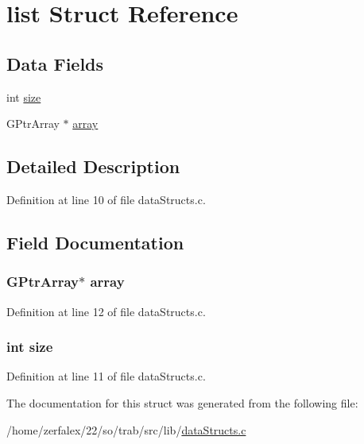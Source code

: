 \hypertarget{structlist}{}\section{list Struct Reference}
\label{structlist}
\subsection*{Data Fields}
\begin{DoxyCompactItemize}
\item 
int \hyperlink{structlist_a439227feff9d7f55384e8780cfc2eb82}{size}
\item 
G\+Ptr\+Array $\ast$ \hyperlink{structlist_a3167491f9e7a19c8575b456fb7830733}{array}
\end{DoxyCompactItemize}


\subsection{Detailed Description}


Definition at line 10 of file data\+Structs.\+c.



\subsection{Field Documentation}
\subsubsection[{\texorpdfstring{array}{array}}]{\setlength{\rightskip}{0pt plus 5cm}G\+Ptr\+Array$\ast$ array}\hypertarget{structlist_a3167491f9e7a19c8575b456fb7830733}{}\label{structlist_a3167491f9e7a19c8575b456fb7830733}


Definition at line 12 of file data\+Structs.\+c.

\subsubsection[{\texorpdfstring{size}{size}}]{\setlength{\rightskip}{0pt plus 5cm}int size}\hypertarget{structlist_a439227feff9d7f55384e8780cfc2eb82}{}\label{structlist_a439227feff9d7f55384e8780cfc2eb82}


Definition at line 11 of file data\+Structs.\+c.



The documentation for this struct was generated from the following file\+:\begin{DoxyCompactItemize}
\item 
/home/zerfalex/22/so/trab/src/lib/\hyperlink{data_structs_8c}{data\+Structs.\+c}\end{DoxyCompactItemize}
